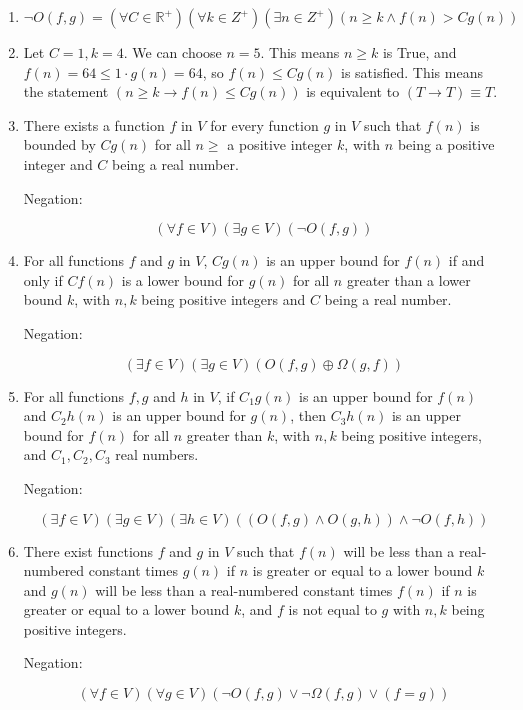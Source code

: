 \documentclass{article}
\newcommand{\R}{\mathbb{R}}
\newcommand*\xor{\oplus}
\begin{document}
\begin{enumerate}
\begin{enumerate}
		      \item $$
			            \lnot O(f,g) = (\forall C \in \R^+)(\forall k \in Z^+)(
			            \exists n \in Z^+) (n \ge k \land f(n) > Cg(n))
		            $$

		      \item Let $C = 1, k = 4$. We can choose $n = 5$. This means $n \ge k$ is
		            True, and $f(n) = 64 \le 1 \cdot g(n) = 64$, so $f(n) \le Cg(n)$ is
		            satisfied. This means the statement $(n \ge k \to f(n) \le C g(n))$
		            is equivalent to $(T \to T) \equiv T$.

		      \item There exists a function $f$ in $V$ for every function $g$ in $V$
		            such that $f(n)$ is bounded by $Cg(n)$ for all $n \ge$
		            a positive integer $k$, with $n$ being a positive integer
		            and $C$ being a real number.

		            Negation:

		            $$
			            (\forall f \in V)(\exists g \in V) (\lnot O(f,g))
		            $$

		      \item For all functions $f$ and $g$ in $V$, $C g(n)$ is an upper bound
		            for $f(n)$ if and only if $Cf(n)$ is a lower bound for $g(n)$ for
		            all $n$ greater than a lower bound $k$, with $n,k$ being positive
		            integers and $C$ being a real number.

		            Negation:

		            $$
			            (\exists f \in V)(\exists g \in V)(O(f,g) \xor \Omega(g,f))
		            $$

		      \item For all functions $f,g$ and $h$ in $V$, if $C_1 g(n)$ is an upper
		            bound for $f(n)$ and $C_2 h(n)$ is an upper bound for $g(n)$, then
		            $C_3 h(n)$ is an upper bound for $f(n)$ for all $n$ greater than $k$,
		            with $n,k$ being positive integers, and $C_1,C_2, C_3$ real numbers.

		            Negation:

		            $$
			            (\exists f \in V)(\exists g \in V)(\exists h \in V)
			            ((O(f,g) \land O(g,h)) \land \lnot O(f,h))
		            $$

		      \item There exist functions $f$ and $g$ in $V$ such that $f(n)$ will be
		            less than a real-numbered constant times $g(n)$ if $n$ is
		            greater or equal to a lower bound $k$ and $g(n)$ will be
		            less than a real-numbered constant times $f(n)$ if $n$ is
		            greater or equal to a lower bound $k$, and $f$ is not equal to
		            $g$ with $n,k$ being positive integers.

		            Negation:

		            $$
			            (\forall f \in V)(\forall g \in V)
			            (\lnot O(f,g) \lor \lnot \Omega(f,g) \lor (f = g))
		            $$
	      \end{enumerate}
\end{enumerate}
\end{document}
